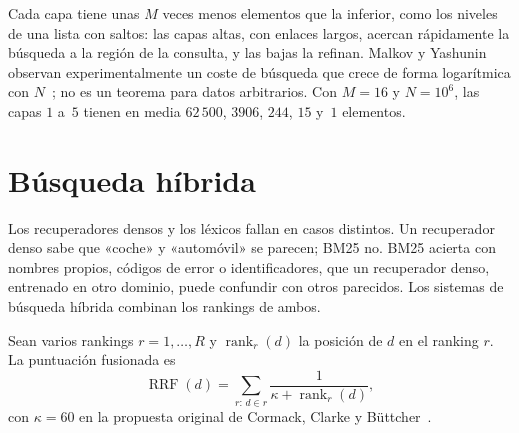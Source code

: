 Cada capa tiene unas $M$ veces menos elementos que la inferior, como los niveles de una lista con saltos: las capas altas, con enlaces largos, acercan rápidamente la búsqueda a la región de la consulta, y las bajas la refinan. Malkov y Yashunin observan experimentalmente un coste de búsqueda que crece de forma logarítmica con $N$~\cite{hnsw}; no es un teorema para datos arbitrarios. Con $M=16$ y $N=10^{6}$, las capas $1$ a~$5$ tienen en media $62\,500$, $3906$, $244$, $15$ y~$1$ elementos.

\section{Búsqueda híbrida}

Los recuperadores densos y los léxicos fallan en casos distintos. Un recuperador denso sabe que «coche» y «automóvil» se parecen; BM25 no. BM25 acierta con nombres propios, códigos de error o identificadores, que un recuperador denso, entrenado en otro dominio, puede confundir con otros parecidos. Los sistemas de búsqueda híbrida combinan los rankings de ambos.

\begin{definicion}\label{def:rrf}
Sean varios rankings $r=1,\dots,R$ y $\operatorname{rank}_r(d)$ la posición de $d$ en el ranking $r$. La puntuación fusionada es
\[
\operatorname{RRF}(d)=\sum_{r:\,d\in r}\frac{1}{\kappa+\operatorname{rank}_r(d)},
\]
con $\kappa=60$ en la propuesta original de Cormack, Clarke y Büttcher~\cite{cormack}.
\end{definicion}

\addtocounter{definicion}{1}%

